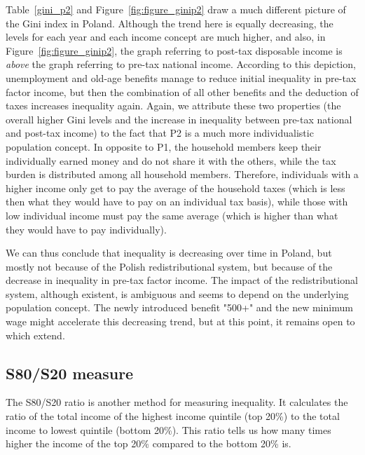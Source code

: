 \documentclass[a4paper]{article}\usepackage[]{graphicx}\usepackage[]{color}
\begin{document}
Table~\ref{gini_p2} and Figure~\ref{fig:figure_ginip2} draw a much different picture of the Gini index in Poland. Although the trend here is equally decreasing, the levels for each year and each income concept are much higher, and also, in Figure~\ref{fig:figure_ginip2}, the graph referring to post-tax disposable income is \textit{above} the graph referring to pre-tax national income. According to this depiction, unemployment and old-age benefits manage to reduce initial inequality in pre-tax factor income, but then the combination of all other benefits and the deduction of taxes increases inequality again. Again, we attribute these two properties (the overall higher Gini levels and the increase in inequality between pre-tax national and post-tax income) to the fact that P2 is a much more individualistic population concept. In opposite to P1, the household members keep their individually earned money and do not share it with the others, while the tax burden is distributed among all household members. Therefore, individuals with a higher income only get to pay the average of the household taxes (which is less then what they would have to pay on an individual tax basis), while those with low individual income must pay the same average (which is higher than what they would have to pay individually).

We can thus conclude that inequality is decreasing over time in Poland, but mostly not because of the Polish redistributional system, but because of the decrease in inequality in pre-tax factor income. The impact of the redistributional system, although existent, is ambiguous and seems to depend on the underlying population concept. The newly introduced benefit "500+" and the new minimum wage might accelerate this decreasing trend, but at this point, it remains open to which extend.  

\subsection{S80/S20 measure}
The S80/S20 ratio is another method for measuring inequality. It calculates the ratio of the total income of the highest income quintile (top 20\%) to the total income to lowest quintile (bottom 20\%). This ratio tells us how many times higher the income of the top 20\% compared to the bottom 20\% is.
\end{document}
